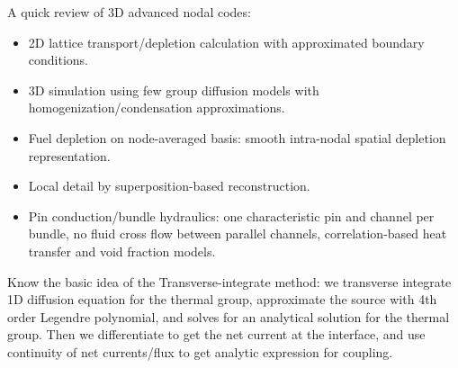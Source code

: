 \documentclass{school-22.211-notes}
\begin{document}
A quick review of 3D advanced nodal codes: 
\begin{itemize}
\item 2D lattice transport/depletion calculation with approximated boundary conditions. 
\item 3D simulation using few group diffusion models with homogenization/condensation approximations. 
\item Fuel depletion on node-averaged basis: smooth intra-nodal spatial depletion representation. 
\item Local detail by superposition-based reconstruction. 
\item Pin conduction/bundle hydraulics: one characteristic pin and channel per bundle, no fluid cross flow between parallel channels, correlation-based heat transfer and void fraction models. 
\end{itemize}
Know the basic idea of the Transverse-integrate method: we transverse integrate 1D diffusion equation for the thermal group, approximate the source with 4th order Legendre polynomial, and solves for an analytical solution for the thermal group. Then we differentiate to get the net current at the interface, and use continuity of net currents/flux to get analytic expression for coupling. 
\end{document}
